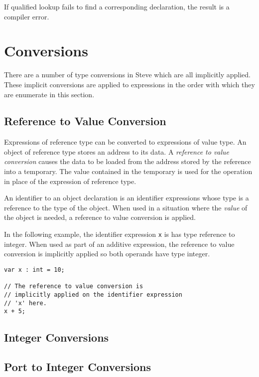 If qualified lookup fails to find a corresponding declaration, the result is a compiler error.

\section{Conversions} \label{conversions_guide}

There are a number of type conversions in Steve which are all implicitly applied. These implicit conversions are applied to expressions in the order with which they are enumerate in this section.

\subsection{Reference to Value Conversion} \label{reftoval_conv}

Expressions of reference type can be converted to expressions of value type. An object of reference type stores an address to its data. A \textit{reference to value conversion} causes the data to be loaded from the address stored by the reference into a temporary. The value contained in the temporary is used for the operation in place of the expression of reference type.

An identifier to an object declaration is an identifier expressions whose type is a reference to the type of the object. When used in a situation where the \textit{value} of the object is needed, a reference to value conversion is applied. 

In the following example, the identifier expression \texttt{x} is has type reference to integer. When used as part of an additive expression, the reference to value conversion is implicitly applied so both operands have type integer.

\noindent\begin{minipage}{\linewidth}
\begin{lstlisting}
var x : int = 10;

// The reference to value conversion is
// implicitly applied on the identifier expression
// 'x' here.
x + 5;
\end{lstlisting}
\end{minipage}

\subsection{Integer Conversions} \label{int_conv}

\subsection{Port to Integer Conversions} \label{port_conv}

